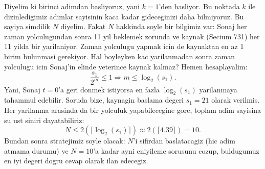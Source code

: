 Diyelim ki birinci adimdan basliyoruz, yani $k=1$'den basliyor. Bu noktada $k$
ile dizinledigimiz adimlar sayisinin kaca kadar gideceginizi daha bilmiyoruz. Bu
sayiya simdilik $N$ diyelim. Fakat $N$ hakkinda soyle bir bilgimiz var: Sonaj
her zaman yolculugundan sonra 11 yil beklemek zorunda ve kaynak (Secium 731) her
11 yilda bir yarilaniyor. Zaman yolculugu yapmak icin de kaynaktan en az 1 birim
bulunmasi gerekiyor. Hal boyleyken kac yarilanmadan sonra zaman yolculugu icin
Sonaj'in elinde yeterince kaynak kalmaz? Hemen hesaplayalim:
%
\begin{equation*}
    \frac{s_1}{2^m} \leq 1 \Rightarrow m \leq \log_2{(s_1)}.
\end{equation*}
%
Yani, Sonaj $t=0$'a geri donmek istiyorsa en fazla $\log_2{(s_1)}$ yarilanmaya
tahammul edebilir. Soruda bize, kaynagin baslama degeri $s_1 = 21$ olarak
verilmis. Her yarilanma arasinda da bir yolculuk yapabilecegine gore, toplam
adim sayisina su ust siniri dayatabiliriz:
\[ N \leq 2 \left(\lceil \log_2{(s_1)} \rceil\right) \approx 2\left(\lceil 4.39
\rceil\right) = 10. \]
%
Bundan sonra stratejimiz soyle olacak: $N$'i sifirdan baslatacagiz (hic adim
atmama durumu) ve $N=10$'a kadar ayni eniyileme sorusunu cozup, buldugumuz en
iyi degeri dogru cevap olarak ilan edecegiz.

